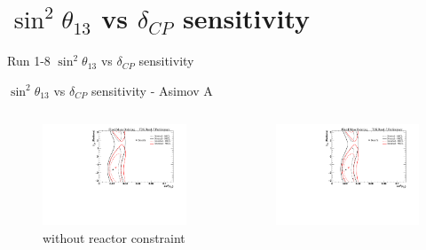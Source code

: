 \documentclass{beamer}
\newcommand{\deltacp}{$\delta_{CP}$\xspace}
\newcommand{\sinsqthetaonethree}{$\sin^2\theta_{13}$\xspace}
\begin{document}
\section{\sinsqthetaonethree vs \deltacp sensitivity}
\begin{frame}
	\centering
	\Large Run 1-8 \sinsqthetaonethree vs \deltacp sensitivity\\
\end{frame}

\begin{frame}{\sinsqthetaonethree vs \deltacp sensitivity - Asimov A}
	\centering
	\begin{columns}
		\begin{column}{0.5\paperwidth}
			\begin{figure}
				\includegraphics[trim={0cm 0cm 0cm 0cm}, clip, scale=0.33] {images/sensitivity/th13_dcp_global_t2k}
				\caption*{without reactor constraint}
			\end{figure}
		\end{column}
		\begin{column}{0.5\paperwidth}
			\begin{figure}
				\includegraphics[trim={0cm 0cm 0cm 0cm}, clip, scale=0.33] {images/sensitivity/th13_dcp_global_t2k}

\end{figure}
\end{column}
\end{columns}
\end{frame}
\end{document}

